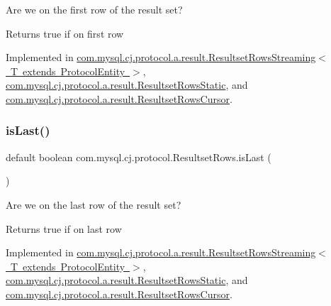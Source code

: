 Are we on the first row of the result set?

\begin{DoxyReturn}{Returns}
true if on first row 
\end{DoxyReturn}


Implemented in \mbox{\hyperlink{classcom_1_1mysql_1_1cj_1_1protocol_1_1a_1_1result_1_1_resultset_rows_streaming_a723004a61b6ca61f2da79c7876c62502}{com.\+mysql.\+cj.\+protocol.\+a.\+result.\+Resultset\+Rows\+Streaming$<$ T extends Protocol\+Entity $>$}}, \mbox{\hyperlink{classcom_1_1mysql_1_1cj_1_1protocol_1_1a_1_1result_1_1_resultset_rows_static_ad16947839519d3bf8c5bc679f6920b5c}{com.\+mysql.\+cj.\+protocol.\+a.\+result.\+Resultset\+Rows\+Static}}, and \mbox{\hyperlink{classcom_1_1mysql_1_1cj_1_1protocol_1_1a_1_1result_1_1_resultset_rows_cursor_a8d0ae8e04f7731f461437563ea13c6b9}{com.\+mysql.\+cj.\+protocol.\+a.\+result.\+Resultset\+Rows\+Cursor}}.

\mbox{\label{interfacecom_1_1mysql_1_1cj_1_1protocol_1_1_resultset_rows_ae52ab20020adafaf87c2f45bae82980d}} 
\subsubsection{\texorpdfstring{is\+Last()}{isLast()}}
{\footnotesize\ttfamily default boolean com.\+mysql.\+cj.\+protocol.\+Resultset\+Rows.\+is\+Last (\begin{DoxyParamCaption}{ }\end{DoxyParamCaption})}

Are we on the last row of the result set?

\begin{DoxyReturn}{Returns}
true if on last row 
\end{DoxyReturn}


Implemented in \mbox{\hyperlink{classcom_1_1mysql_1_1cj_1_1protocol_1_1a_1_1result_1_1_resultset_rows_streaming_abe926437ff8f266271a0e2403404dbc4}{com.\+mysql.\+cj.\+protocol.\+a.\+result.\+Resultset\+Rows\+Streaming$<$ T extends Protocol\+Entity $>$}}, \mbox{\hyperlink{classcom_1_1mysql_1_1cj_1_1protocol_1_1a_1_1result_1_1_resultset_rows_static_a2714d5e0fe10d3cb3b148a3fb2d6fec4}{com.\+mysql.\+cj.\+protocol.\+a.\+result.\+Resultset\+Rows\+Static}}, and \mbox{\hyperlink{classcom_1_1mysql_1_1cj_1_1protocol_1_1a_1_1result_1_1_resultset_rows_cursor_ae16f7cc758e2518a8cf1c6acfddeed10}{com.\+mysql.\+cj.\+protocol.\+a.\+result.\+Resultset\+Rows\+Cursor}}.

